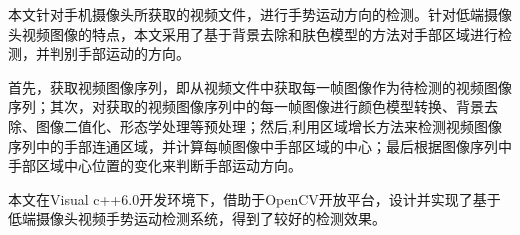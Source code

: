 
{ %

本文针对手机摄像头所获取的视频文件，进行手势运动方向的检测。针对低端摄像头视频图像的特点，本文采用了基于背景去除和肤色模型的方法对手部区域进行检测，并判别手部运动的方向。

首先，获取视频图像序列，即从视频文件中获取每一帧图像作为待检测的视频图像序列；其次，对获取的视频图像序列中的每一帧图像进行颜色模型转换、背景去除、图像二值化、形态学处理等预处理；然后,利用区域增长方法来检测视频图像序列中的手部连通区域，并计算每帧图像中手部区域的中心；最后根据图像序列中手部区域中心位置的变化来判断手部运动方向。

本文在Visual c++6.0开发环境下，借助于OpenCV开放平台，设计并实现了基于低端摄像头视频手势运动检测系统，得到了较好的检测效果。


}

